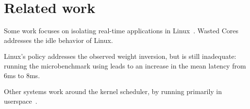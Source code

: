 \section{Related work}

Some work focuses on isolating real-time applications in
Linux~\cite{rt-in-linux, state-rt-linux}. Wasted Cores~\cite{wasted-cores}
addresses the idle behavior of Linux. 

Linux's \schedidle{} policy addresses the observed weight inversion, but is
still inadequate: running the microbenchmark using \schedidle{} leads to an
increase in the mean latency from 6ms to 8ms.

Other systems work around the kernel scheduler, by running primarily in
userspace~\cite{perfiso,caladan,skyloft}.